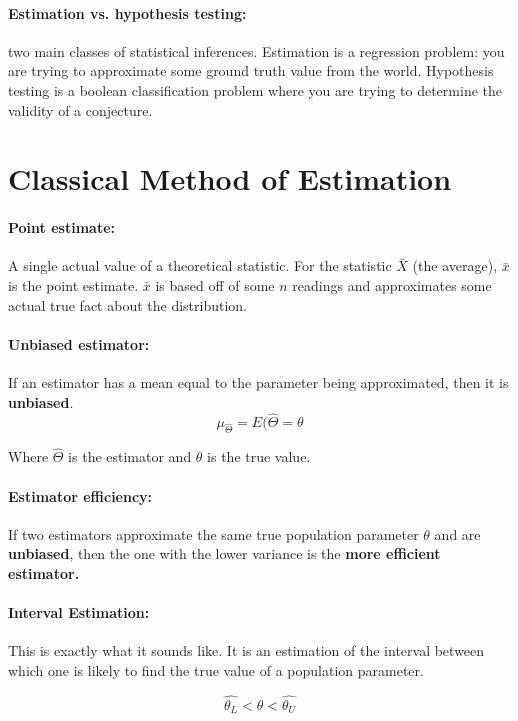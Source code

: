 \documentclass[a4paper,12pt]{report}
\begin{document}
\paragraph{Estimation vs. hypothesis testing: } two main classes of statistical inferences. Estimation is a regression problem: you are trying to approximate some ground truth value from the world. Hypothesis testing is a boolean classification problem where you are trying to determine the validity of a conjecture. 

\section{Classical Method of Estimation}

\paragraph{Point estimate: } A single actual value of a theoretical statistic. For the statistic $\bar{X}$ (the average), $\bar{x}$ is the point estimate. $\bar{x}$ is based off of some $n$ readings and approximates some actual true fact about the distribution.

\paragraph{Unbiased estimator: } If an estimator has a mean equal to the parameter being approximated, then it is \textbf{unbiased}. $$\mu_{\hat{\Theta}} = E(\hat{\Theta} = \theta$$

Where $\hat{\Theta}$ is the estimator and $\theta$ is the true value.

\paragraph{Estimator efficiency: } If two estimators approximate the same true population parameter $\theta$ and are \textbf{unbiased}, then the one with the lower variance is the \textbf{more efficient estimator.} 

\paragraph{Interval Estimation: } This is exactly what it sounds like. It is an estimation of the interval between which one is likely to find the true value of a population parameter.

$$\hat{\theta_L} < \theta < \hat{\theta_U}$$
\end{document}

